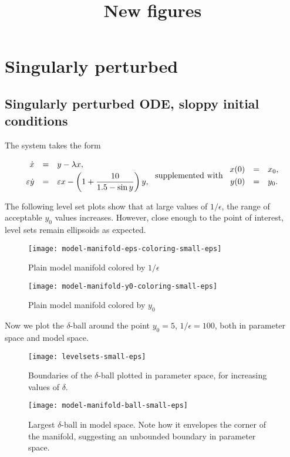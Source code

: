 \documentclass[11pt]{article}
\title{New figures}
\newcommand{\eps}{\varepsilon}
\newcommand{\be}{\begin{equation}}
\newcommand{\ee}{\end{equation}}
\begin{document}
\maketitle

\section{Singularly perturbed}

\subsection{Singularly perturbed ODE, sloppy initial conditions}

The system takes the form

\be
\begin{array}{rcl}
 \dot{x} &=& y - \lambda x ,
\vspace*{1mm}\\
 \eps \dot{y} &=& \eps x - \displaystyle\left(1+\frac{10}{1.5-\sin y}\right) y ,
\end{array}
\ \mbox{supplemented with} \
\begin{array}{rcl}
 x(0) &=& x_0 ,
\vspace*{1mm}\\
 y(0) &=& y_0 .
\end{array}
\label{elem-ODE}
\ee

The following level set plots show that at large values of $1/\epsilon$, the range of acceptable $y_0$ values increases. However, close enough to the point of interest, level sets remain ellipsoids as expected.

\begin{figure}[ht!]
    \centering
    \texttt{[image: model-manifold-eps-coloring-small-eps]}
    \caption{Plain model manifold colored by $1/\epsilon$}
\end{figure} %
\begin{figure}[ht!]
    \centering
    \texttt{[image: model-manifold-y0-coloring-small-eps]}
    \caption{Plain model manifold colored by $y_0$}
\end{figure} %

Now we plot the $\delta$-ball around the point $y_0 = 5$, $1/\epsilon = 100$, both in parameter space and model space.

\begin{figure}[ht!]
    \centering
    \texttt{[image: levelsets-small-eps]}
    \caption{Boundaries of the $\delta$-ball plotted in parameter space, for increasing values of $\delta$.}
\end{figure}
\begin{figure}[ht!]
    \centering
    \texttt{[image: model-manifold-ball-small-eps]}
    \caption{Largest $\delta$-ball in model space. Note how it envelopes the corner of the manifold, suggesting an unbounded boundary in parameter space.}
\end{figure}
\end{document}
